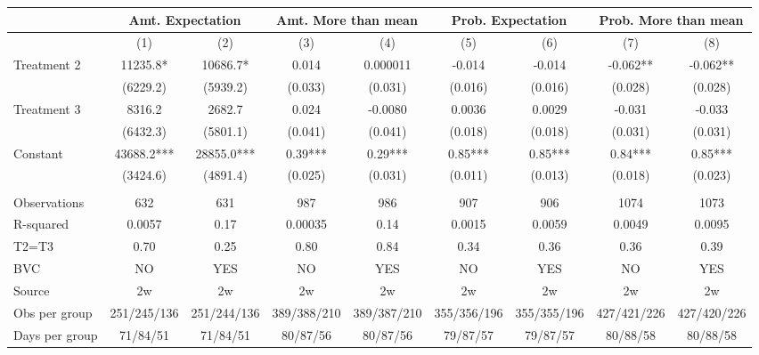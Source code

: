 \begin{tabular}{lcccccccc}
\toprule
      & \multicolumn{2}{c}{Amt. Expectation} & \multicolumn{2}{c}{Amt. More than mean} & \multicolumn{2}{c}{Prob. Expectation} & \multicolumn{2}{c}{Prob. More than mean} \\
\midrule
      & (1)   & (2)   & (3)   & (4)   & (5)   & (6)   & (7)   & (8) \\
\midrule
Treatment 2 & 11235.8* & 10686.7* & 0.014 & 0.000011 & -0.014 & -0.014 & -0.062** & -0.062** \\
      & (6229.2) & (5939.2) & (0.033) & (0.031) & (0.016) & (0.016) & (0.028) & (0.028) \\
Treatment 3 & 8316.2 & 2682.7 & 0.024 & -0.0080 & 0.0036 & 0.0029 & -0.031 & -0.033 \\
      & (6432.3) & (5801.1) & (0.041) & (0.041) & (0.018) & (0.018) & (0.031) & (0.031) \\
Constant & 43688.2*** & 28855.0*** & 0.39*** & 0.29*** & 0.85*** & 0.85*** & 0.84*** & 0.85*** \\
      & (3424.6) & (4891.4) & (0.025) & (0.031) & (0.011) & (0.013) & (0.018) & (0.023) \\
      &       &       &       &       &       &       &       &  \\
\midrule
Observations & 632   & 631   & 987   & 986   & 907   & 906   & 1074  & 1073 \\
R-squared & 0.0057 & 0.17  & 0.00035 & 0.14  & 0.0015 & 0.0059 & 0.0049 & 0.0095 \\
T2=T3 & 0.70  & 0.25  & 0.80  & 0.84  & 0.34  & 0.36  & 0.36  & 0.39 \\
BVC   & NO    & YES   & NO    & YES   & NO    & YES   & NO    & YES \\
Source & 2w    & 2w    & 2w    & 2w    & 2w    & 2w    & 2w    & 2w \\
Obs per group & 251/245/136 & 251/244/136 & 389/388/210 & 389/387/210 & 355/356/196 & 355/355/196 & 427/421/226 & 427/420/226 \\
Days per group & 71/84/51 & 71/84/51 & 80/87/56 & 80/87/56 & 79/87/57 & 79/87/57 & 80/88/58 & 80/88/58 \\
\bottomrule
\bottomrule
\end{tabular}%
